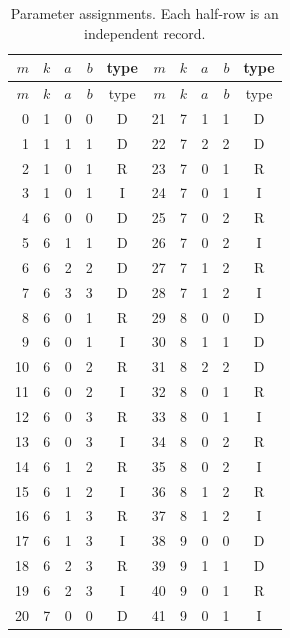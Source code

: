 \begin{longtable}{@{}rrrrcrrrrc@{}}
\caption{Parameter assignments. Each half-row is an independent record.}\label{tab:assignments}\\
\toprule $m$&$k$&$a$&$b$&type&$m$&$k$&$a$&$b$&type\\\midrule\endfirsthead
\toprule $m$&$k$&$a$&$b$&type&$m$&$k$&$a$&$b$&type\\\midrule\endhead
0 & 1 & 0 & 0 & D & 21 & 7 & 1 & 1 & D \\
1 & 1 & 1 & 1 & D & 22 & 7 & 2 & 2 & D \\
2 & 1 & 0 & 1 & R & 23 & 7 & 0 & 1 & R \\
3 & 1 & 0 & 1 & I & 24 & 7 & 0 & 1 & I \\
4 & 6 & 0 & 0 & D & 25 & 7 & 0 & 2 & R \\
5 & 6 & 1 & 1 & D & 26 & 7 & 0 & 2 & I \\
6 & 6 & 2 & 2 & D & 27 & 7 & 1 & 2 & R \\
7 & 6 & 3 & 3 & D & 28 & 7 & 1 & 2 & I \\
8 & 6 & 0 & 1 & R & 29 & 8 & 0 & 0 & D \\
9 & 6 & 0 & 1 & I & 30 & 8 & 1 & 1 & D \\
10 & 6 & 0 & 2 & R & 31 & 8 & 2 & 2 & D \\
11 & 6 & 0 & 2 & I & 32 & 8 & 0 & 1 & R \\
12 & 6 & 0 & 3 & R & 33 & 8 & 0 & 1 & I \\
13 & 6 & 0 & 3 & I & 34 & 8 & 0 & 2 & R \\
14 & 6 & 1 & 2 & R & 35 & 8 & 0 & 2 & I \\
15 & 6 & 1 & 2 & I & 36 & 8 & 1 & 2 & R \\
16 & 6 & 1 & 3 & R & 37 & 8 & 1 & 2 & I \\
17 & 6 & 1 & 3 & I & 38 & 9 & 0 & 0 & D \\
18 & 6 & 2 & 3 & R & 39 & 9 & 1 & 1 & D \\
19 & 6 & 2 & 3 & I & 40 & 9 & 0 & 1 & R \\
20 & 7 & 0 & 0 & D & 41 & 9 & 0 & 1 & I \\
\bottomrule
\end{longtable}
